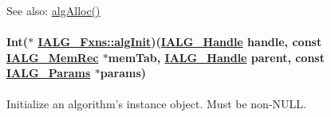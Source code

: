 \begin{Desc}
\item[See also:]\hyperlink{struct_i_a_l_g___fxns_1640ba8f4033af1ce3887283c7a12746}{alg\-Alloc()} \end{Desc}
\hypertarget{struct_i_a_l_g___fxns_94eca7c58cceb112eccd970a6cf3f569}{
\paragraph[algInit]{\setlength{\rightskip}{0pt plus 5cm}Int($\ast$ \hyperlink{struct_i_a_l_g___fxns_94eca7c58cceb112eccd970a6cf3f569}{IALG\_\-Fxns::alg\-Init})(\hyperlink{struct_i_a_l_g___obj}{IALG\_\-Handle} handle, const \hyperlink{struct_i_a_l_g___mem_rec}{IALG\_\-Mem\-Rec} $\ast$mem\-Tab, \hyperlink{struct_i_a_l_g___obj}{IALG\_\-Handle} parent, const \hyperlink{struct_i_a_l_g___params}{IALG\_\-Params} $\ast$params)}\hfill}
\label{struct_i_a_l_g___fxns_94eca7c58cceb112eccd970a6cf3f569}


Initialize an algorithm's instance object. Must be non-NULL. 

